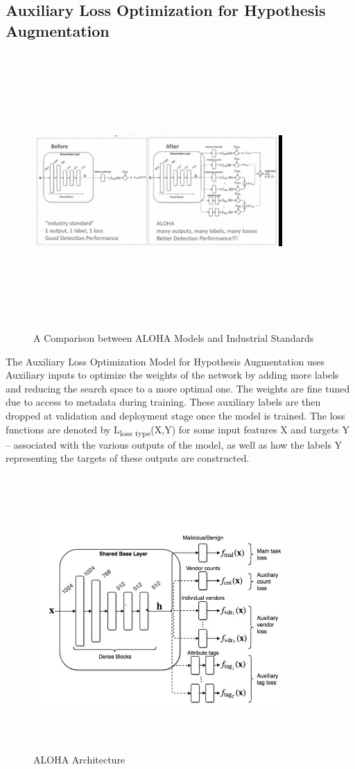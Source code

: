 \documentclass[conference]{IEEEtran}
\begin{document}
\subsection{Auxiliary Loss Optimization for Hypothesis Augmentation\cite{b1}}
\begin{figure}[!h]
\centerline{\includegraphics[width=9.5cm,height=10.5cm,keepaspectratio]{comparison arch.png}}
\caption{A Comparison between ALOHA Models and Industrial Standards }
\label{fig}
\end{figure}
The Auxiliary Loss Optimization Model for Hypothesis Augmentation uses Auxiliary inputs to optimize the weights of the network by adding more labels and reducing the search space to a more optimal one. The weights are fine tuned due to access to metadata during training. These auxiliary labels are then dropped at validation and deployment stage once the model is trained. 
The loss functions are denoted by L\textsubscript{loss type}(X,Y) for some input features X and targets Y – associated with the various outputs of the model, as well as how the labels Y representing the targets of these outputs are constructed. 
\begin{figure}[!h]
\centerline{\includegraphics[width=9.5cm,height=10.5cm,keepaspectratio]{aloha.JPG}}
\caption{ALOHA Architecture }
\label{fig}
\end{figure}
\end{document}
